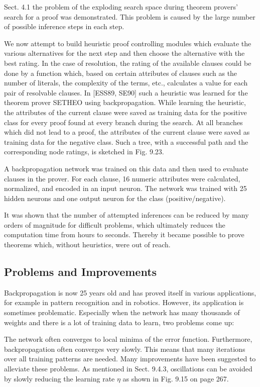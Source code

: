 \documentclass[10pt]{book}
\begin{document}
Sect. 4.1 the problem of the exploding search space during theorem provers' search for a proof was demonstrated. This problem is caused by the large number of possible inference steps in each step.

We now attempt to build heuristic proof controlling modules which evaluate the various alternatives for the next step and then choose the alternative with the best rating. In the case of resolution, the rating of the available clauses could be done by a function which, based on certain attributes of clauses such as the number of literals, the complexity of the terms, etc., calculates a value for each pair of resolvable clauses. In [ESS89, SE90] such a heuristic was learned for the theorem prover SETHEO using backpropagation. While learning the heuristic, the attributes of the current clause were saved as training data for the positive class for every proof found at every branch during the search. At all branches which did not lead to a proof, the attributes of the current clause were saved as training data for the negative class. Such a tree, with a successful path and the corresponding node ratings, is sketched in Fig. 9.23.

A backpropagation network was trained on this data and then used to evaluate clauses in the prover. For each clause, 16 numeric attributes were calculated, normalized, and encoded in an input neuron. The network was trained with 25 hidden neurons and one output neuron for the class (positive/negative).

It was shown that the number of attempted inferences can be reduced by many orders of magnitude for difficult problems, which ultimately reduces the computation time from hours to seconds. Thereby it became possible to prove theorems which, without heuristics, were out of reach.

\subsection{Problems and Improvements}
Backpropagation is now 25 years old and has proved itself in various applications, for example in pattern recognition and in robotics. However, its application is sometimes problematic. Especially when the network has many thousands of weights and there is a lot of training data to learn, two problems come up:

The network often converges to local minima of the error function. Furthermore, backpropagation often converges very slowly. This means that many iterations over all training patterns are needed. Many improvements have been suggested to alleviate these problems. As mentioned in Sect. 9.4.3, oscillations can be avoided by slowly reducing the learning rate $\eta$ as shown in Fig. 9.15 on page 267.
\end{document}
